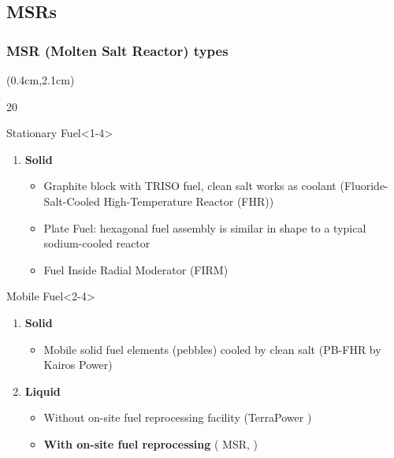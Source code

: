 \subsection{\glspl{MSR}}

\begin{frame}
\frametitle{MSR (Molten Salt Reactor) types}
\begin{textblock*}{12cm}(0.4cm,2.1cm) %
	\begin{overlayarea}{\linewidth}{20\baselineskip}
		\begin{block}{Stationary Fuel}<1-4>
			\begin{enumerate}
				\item \textbf{Solid}
				\begin{itemize}
					\item Graphite block with TRISO fuel, clean salt works as 
					coolant (Fluoride-Salt-Cooled High-Temperature Reactor 
					(FHR))
					\item Plate Fuel: hexagonal fuel assembly is similar in 
					shape 
					to a typical sodium-cooled reactor
					\item Fuel Inside Radial Moderator (FIRM)
				\end{itemize}
			\end{enumerate}
		\end{block}
		
		\begin{block}{Mobile Fuel}<2-4>
			\begin{enumerate}
				\item \textbf{Solid}
				\begin{itemize}
					\item<2-> Mobile solid fuel elements (pebbles) cooled by 
					clean salt (PB-FHR by Kairos Power)
				\end{itemize}
				\item<3-> \textbf{Liquid}
				\begin{itemize}
					\item<3-> Without on-site fuel reprocessing facility 
					(TerraPower )
					\item<4-> \textbf{With on-site fuel reprocessing} 
					( MSR, )
				\end{itemize}
			\end{enumerate}
		\end{block}
	\end{overlayarea}
\end{textblock*}
\end{frame}


